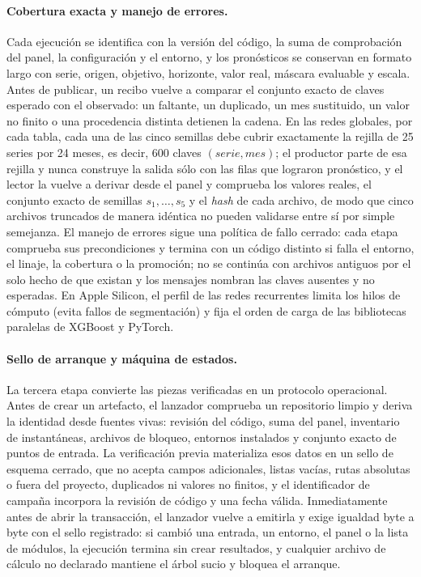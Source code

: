 \documentclass[12pt,letterpaper]{report}
\begin{document}
\paragraph{Cobertura exacta y manejo de errores.} Cada ejecución se identifica con la versión
del código, la suma de comprobación del panel, la configuración y el entorno, y los pronósticos
se conservan en formato largo con serie, origen, objetivo, horizonte, valor real, máscara
evaluable y escala. Antes de publicar, un recibo vuelve a comparar el conjunto exacto de claves
esperado con el observado: un faltante, un duplicado, un mes sustituido, un valor no finito o
una procedencia distinta detienen la cadena. En las redes globales, por cada tabla, cada una de
las cinco semillas debe cubrir exactamente la rejilla de 25 series por 24 meses, es decir, 600
claves $(\textit{serie},\textit{mes})$; el productor parte de esa rejilla y nunca construye la
salida sólo con las filas que lograron pronóstico, y el lector la vuelve a derivar desde el
panel y comprueba los valores reales, el conjunto exacto de semillas $s_1,\ldots,s_5$ y el
\textit{hash} de cada archivo, de modo que cinco archivos truncados de manera idéntica no pueden
validarse entre sí por simple semejanza. El manejo de errores sigue una política de fallo cerrado: cada etapa comprueba sus precondiciones y termina con un código distinto si falla el
entorno, el linaje, la cobertura o la promoción; no se continúa con archivos antiguos por el solo
hecho de que existan y los mensajes nombran las claves ausentes y no esperadas. En Apple Silicon,
el perfil de las redes recurrentes limita los hilos de cómputo (evita fallos de segmentación) y
fija el orden de carga de las bibliotecas paralelas de XGBoost y PyTorch.

\paragraph{Sello de arranque y máquina de estados.} La tercera etapa convierte las piezas
verificadas en un protocolo operacional. Antes de crear un artefacto, el lanzador comprueba un
repositorio limpio y deriva la identidad desde fuentes vivas: revisión del código, suma del
panel, inventario de instantáneas, archivos de bloqueo, entornos instalados y conjunto exacto de
puntos de entrada. La verificación previa materializa esos datos en un sello de esquema cerrado,
que no acepta campos adicionales, listas vacías, rutas absolutas o fuera del proyecto, duplicados
ni valores no finitos, y el identificador de campaña incorpora la revisión de código y una fecha
válida. Inmediatamente antes de abrir la transacción, el lanzador vuelve a emitirla y exige
igualdad byte a byte con el sello registrado: si cambió una entrada, un entorno, el panel o la
lista de módulos, la ejecución termina sin crear resultados, y cualquier archivo de cálculo no
declarado mantiene el árbol sucio y bloquea el arranque.
\end{document}
